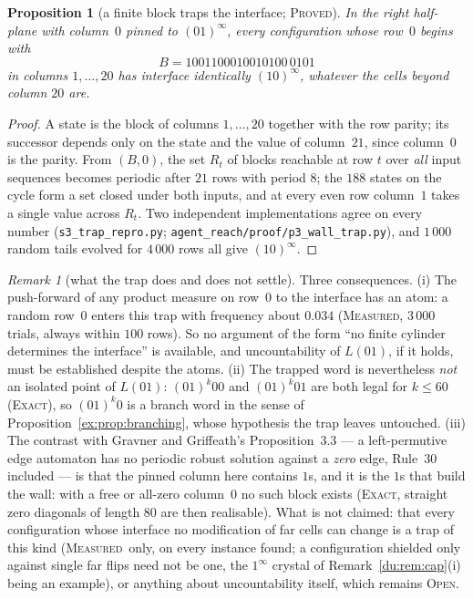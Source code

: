 \documentclass[11pt]{article}
\newtheorem{proposition}[theorem]{Proposition}
\theoremstyle{definition}
\theoremstyle{remark}
\newtheorem{remark}[theorem]{Remark}
\newcommand{\PROVED}{\textsc{Proved}}
\newcommand{\EXACT}{\textsc{Exact}}
\newcommand{\MEASURED}{\textsc{Measured}}
\newcommand{\OPEN}{\textsc{Open}}
\begin{document}
\begin{proposition}[a finite block traps the interface; \PROVED]\label{du:prop:trap}
In the right half-plane with column~$0$ pinned to $(01)^{\infty}$, every configuration whose row~$0$
begins with
\[
B=1001100010010100\,0101
\]
in columns $1,\dots,20$ has interface identically $(10)^{\infty}$, whatever the cells beyond column
$20$ are.
\end{proposition}
\begin{proof}
A state is the block of columns $1,\dots,20$ together with the row parity; its successor depends only on
the state and the value of column~$21$, since column~$0$ is the parity. From $(B,0)$, the set $R_t$ of
blocks reachable at row $t$ over \emph{all} input sequences becomes periodic after $21$ rows with period
$8$; the $188$ states on the cycle form a set closed under both inputs, and at every even row column~$1$
takes a single value across $R_t$. Two independent implementations agree on every number
(\texttt{s3\_trap\_repro.py}; \texttt{agent\_reach/proof/p3\_wall\_trap.py}), and $1\,000$ random
tails evolved for $4\,000$ rows all give $(10)^{\infty}$.
\end{proof}

\begin{remark}[what the trap does and does not settle]\label{du:rem:trap}
Three consequences. (i) The push-forward of any product measure on row~$0$ to the interface has an
atom: a random row~$0$ enters this trap with frequency about $0.034$ (\MEASURED, $3\,000$ trials, always
within $100$ rows). So no argument of the form ``no finite cylinder determines the interface'' is
available, and uncountability of $L(01)$, if it holds, must be established despite the atoms. (ii) The
trapped word is nevertheless \emph{not} an isolated point of $L(01)$: $(01)^{k}00$ and $(01)^{k}01$ are
both legal for $k\le60$ (\EXACT), so $(01)^{k}0$ is a branch word in the sense of
Proposition~\ref{ex:prop:branching}, whose hypothesis the trap leaves untouched. (iii) The contrast with
Gravner and Griffeath's Proposition~3.3 \cite{GG} --- a left-permutive edge automaton has no periodic
robust solution against a \emph{zero} edge, Rule~$30$ included --- is that the pinned column here
contains $1$s, and it is the $1$s that build the wall: with a free or all-zero column~$0$ no such block
exists (\EXACT, straight zero diagonals of length $80$ are then realisable). What is not claimed: that
every configuration whose interface no modification of far cells can change is a trap of this kind
(\MEASURED\ only, on every instance found; a configuration shielded only against single far flips need
not be one, the $1^{\infty}$ crystal of Remark~\ref{du:rem:cap}(i) being an example), or anything about
uncountability itself, which remains \OPEN.
\end{remark}
\end{document}
